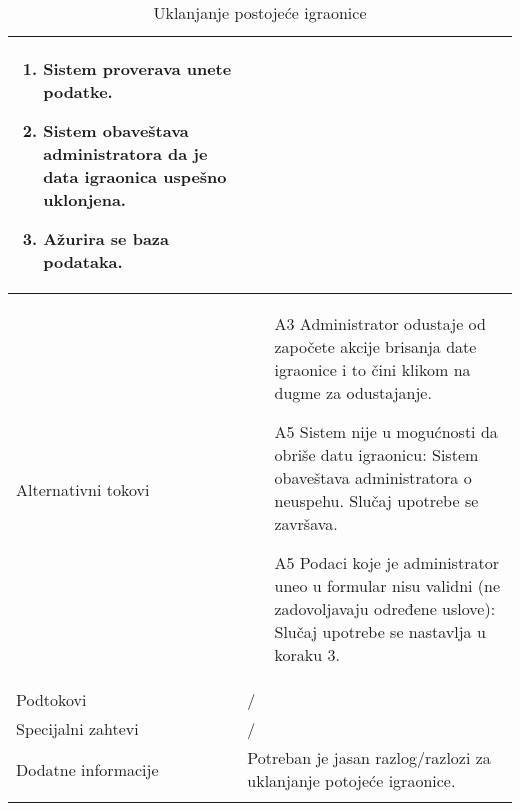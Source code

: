 \documentclass[../main.tex]{subfiles}
\begin{document}
\begin{longtable}{| p{} | p{} |}
\begin{enumerate}
        \item Sistem proverava unete podatke. %
        \item Sistem obaveštava administratora da je data igraonica uspešno uklonjena.
        \item Ažurira se baza podataka. %
    \end{enumerate}\\
\hline
    Alternativni tokovi & \begin{itemize}
        \item[A3] Administrator odustaje od započete akcije brisanja date igraonice i to čini klikom na dugme za odustajanje.
        \item[A5]  Sistem nije u mogućnosti da obriše datu igraonicu: Sistem obaveštava administratora o neuspehu. Slučaj upotrebe se završava.
        \item[A5]  Podaci koje je administrator uneo u formular nisu validni (ne zadovoljavaju određene uslove): Slučaj upotrebe se nastavlja u koraku 3. %
    \end{itemize}\\
\hline
    Podtokovi & /\\
\hline
    Specijalni zahtevi & /\\
\hline
    Dodatne informacije & Potreban je jasan razlog/razlozi za uklanjanje potojeće igraonice.
    \\
\hline
\caption{Uklanjanje postojeće igraonice} %
\end{longtable}
\end{document}

